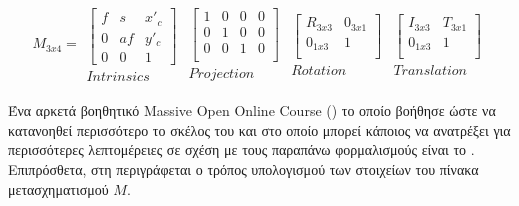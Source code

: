 \begin{gather}
	M_{3x4} = 
    \begin{matrix}
        \begin{bmatrix} 
            f & s & x'_c \\ 
            0 & af & y'_c \\
            0  & 0 & 1
        \end{bmatrix}\\
        Intrinsics
    \end{matrix}
    \begin{matrix}
        \begin{bmatrix} 
            1 & 0 & 0 & 0 \\ 
            0 & 1 & 0 & 0 \\ 
            0 & 0 & 1 & 0 \\ 
        \end{bmatrix}\\
        Projection
    \end{matrix}
    \begin{matrix}
        \begin{bmatrix} 
            R_{3x3} & 0_{3x1} \\ 
            0_{1x3} & 1 \\  
        \end{bmatrix}\\
        Rotation
    \end{matrix}
    \begin{matrix}
        \begin{bmatrix} 
            I_{3x3} & T_{3x1} \\ 
            0_{1x3} & 1 \\  
        \end{bmatrix}\\
        Translation
    \end{matrix} \label{eq:world-to-image-matrix}
\end{gather}

Ένα αρκετά βοηθητικό Massive Open Online Course () το οποίο βοήθησε ώστε να κατανοηθεί περισσότερο το σκέλος του  και στο οποίο μπορεί κάποιος να ανατρέξει για περισσότερες λεπτομέρειες σε σχέση με τους παραπάνω φο\-ρμα\-λι\-σμούς είναι το \cite{introduction-to-computer-vision}. Επιπρόσθετα, στη  περιγράφεται ο τρόπος υπολογισμού των στοιχείων του πίνακα μετασχηματισμού $M$.


